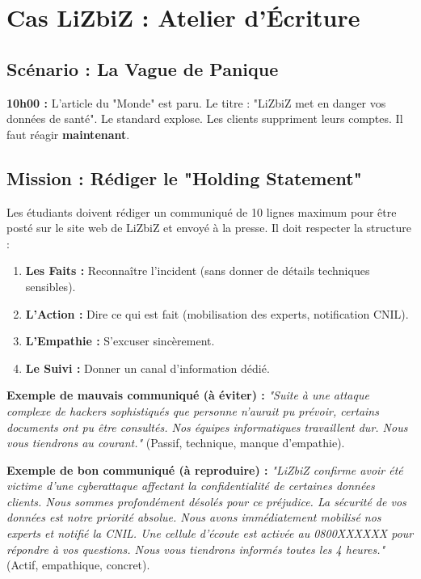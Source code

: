 \section{Cas LiZbiZ : Atelier d'Écriture}

\subsection{Scénario : La Vague de Panique}

\begin{boxlizbiz}
\textbf{10h00 :} L'article du "Monde" est paru. Le titre : "LiZbiZ met en danger vos données de santé".
Le standard explose. Les clients suppriment leurs comptes. Il faut réagir \textbf{maintenant}.
\end{boxlizbiz}

\subsection{Mission : Rédiger le "Holding Statement"}

Les étudiants doivent rédiger un communiqué de 10 lignes maximum pour être posté sur le site web de LiZbiZ et envoyé à la presse. Il doit respecter la structure :

\begin{enumerate}
    \item \textbf{Les Faits :} Reconnaître l'incident (sans donner de détails techniques sensibles).
    \item \textbf{L'Action :} Dire ce qui est fait (mobilisation des experts, notification CNIL).
    \item \textbf{L'Empathie :} S'excuser sincèrement.
    \item \textbf{Le Suivi :} Donner un canal d'information dédié.
\end{enumerate}

\textbf{Exemple de mauvais communiqué (à éviter) :}
\textit{"Suite à une attaque complexe de hackers sophistiqués que personne n'aurait pu prévoir, certains documents ont pu être consultés. Nos équipes informatiques travaillent dur. Nous vous tiendrons au courant."} (Passif, technique, manque d'empathie).

\textbf{Exemple de bon communiqué (à reproduire) :}
\textit{"LiZbiZ confirme avoir été victime d'une cyberattaque affectant la confidentialité de certaines données clients. Nous sommes profondément désolés pour ce préjudice. La sécurité de vos données est notre priorité absolue. Nous avons immédiatement mobilisé nos experts et notifié la CNIL. Une cellule d'écoute est activée au 0800XXXXXX pour répondre à vos questions. Nous vous tiendrons informés toutes les 4 heures."} (Actif, empathique, concret).

